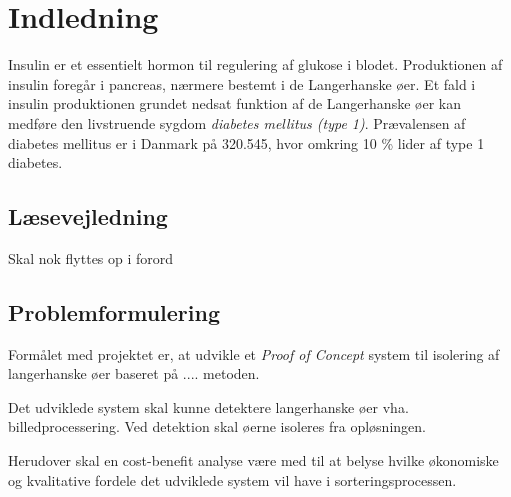 \chapter{Indledning}
Insulin er et essentielt hormon til regulering af glukose i blodet. Produktionen af insulin foregår i pancreas, nærmere bestemt i de Langerhanske øer. Et fald i insulin produktionen grundet nedsat funktion af de Langerhanske øer kan medføre den livstruende sygdom \textit{diabetes mellitus (type 1)}. Prævalensen af diabetes mellitus er i Danmark på 320.545, hvor omkring 10 \% lider af type 1 diabetes. 




\section*{Læsevejledning}
Skal nok flyttes op i forord





\section{Problemformulering}
Formålet med projektet er, at udvikle et \textit{Proof of Concept} system til isolering af langerhanske øer baseret på .... metoden.

Det udviklede system skal kunne detektere langerhanske øer vha. billedprocessering. Ved detektion skal øerne isoleres fra opløsningen. 

Herudover skal en cost-benefit analyse være med til at belyse hvilke økonomiske og kvalitative fordele det udviklede system vil have i sorteringsprocessen.

